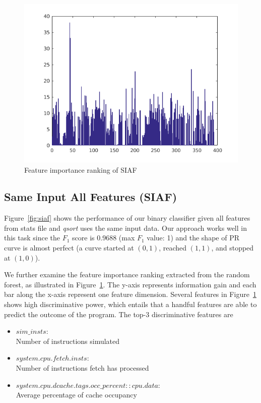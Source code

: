 \begin{figure}[t]
\begin{center}
   \includegraphics[width=0.8\linewidth]{./figures/feat_same.png}
\end{center}
\vspace{-0.5cm}
   \caption{Feature importance ranking of SIAF}
   \vspace{-0.3cm}
\label{fig:feat-same}
\end{figure}

\subsection{Same Input All Features (SIAF)}
Figure~\ref{fig:siaf} shows the performance of our binary classifier given all features from stats file and \emph{qsort} uses the same input data. Our approach works well in this task since the $F_1$ score is 0.9688 (max $F_1$ value: 1) and the shape of PR curve is almost perfect (a curve started at $(0,1)$, reached $(1,1)$, and stopped at $(1,0)$). 

We further examine the feature importance ranking extracted from the random forest, as illustrated in Figure~\ref{fig:feat-same}. The y-axis represents information gain and each bar along the x-axis represent one feature dimension. Several features in Figure~\ref{fig:feat-same} shows high discriminative power, which entails that a handful features are able to predict the outcome of the program. The top-3 discriminative features are 
\begin{itemize}
\item $sim\_insts$: \\
Number of instructions simulated
\item $system.cpu.fetch.insts$: \\
Number of instructions fetch has processed
\item $system.cpu.dcache.tags.occ\_percent::cpu.data$: \\
Average percentage of cache occupancy
\end{itemize}


